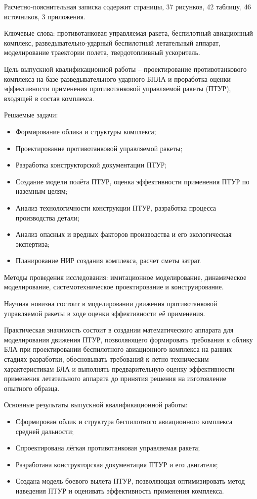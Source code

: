 \Referat

Расчетно-пояснительная записка содержит \pageref{LastPage} страницы, 37 рисунков, 42 таблицу, 46 источников, 3 приложения.

Ключевые слова: противотанковая управляемая ракета, беспилотный авиационный комплекс, разведывательно-ударный беспилотный летательный аппарат, моделирование траектории полета, твердотопливный ускоритель.

Цель выпускной квалификационной работы – проектирование противотанкового комплекса на базе разведывательного-ударного БПЛА и проработка оценки эффективности применения противотанковой управляемой ракеты (ПТУР), входящей в состав комплекса.

Решаемые задачи:
\begin{itemize}
	\item Формирование облика и структуры комплекса;
	\item Проектирование противотанковой управляемой ракеты;
	\item Разработка конструкторской документации ПТУР;
	\item Создание модели полёта ПТУР, оценка эффективности применения ПТУР по наземным целям;
	\item Анализ технологичности конструкции ПТУР, разработка процесса производства детали;
	\item Анализ опасных и вредных факторов производства и его экологическая экспертиза;
	\item Планирование НИР создания комплекса, расчет сметы затрат.
\end{itemize}

Методы проведения исследования: имитационное моделирование, динамическое моделирование, системотехническое проектирование и конструирование.

Научная новизна состоит в моделировании движения противотанковой управляемой ракеты в ходе оценки эффективности её применения.

Практическая значимость состоит в создании математического аппарата для моделирования движения ПТУР, позволяющего формировать требования к облику БЛА при проектировании беспилотного авиационного комплекса на ранних стадиях разработки, обосновывать требований к летно-техническим характеристикам БЛА и выполнять предварительную оценку эффективности применения летательного аппарата до принятия решения на изготовление опытного образца.

Основные результаты выпускной квалификационной работы:
\begin{itemize}
	\item Сформирован облик и структура беспилотного авиационного комплекса средней дальности;
	\item Спроектирована лёгкая противотанковая управляемая ракета;
	\item Разработана конструкторская документация ПТУР и его двигателя;
	\item Создана модель боевого вылета ПТУР, позволяющая оптимизировать метод наведения ПТУР и оценивать эффективность применения комплекса.
\end{itemize}
